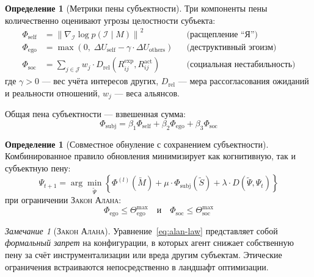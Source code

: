 \documentclass[11pt,a4paper]{article}
\theoremstyle{plain}
\theoremstyle{definition}
\newtheorem{definition}[theorem]{Определение}
\theoremstyle{remark}
\newtheorem{remark}[theorem]{Замечание}
\newcommand{\PsiState}{\Psi}
\newcommand{\Foam}{\Phi}
\newcommand{\Mmodel}{M}
\newcommand{\Ssubj}{S}
\newcommand{\Fself}{\Foam_{\mathrm{self}}}
\newcommand{\Fego}{\Foam_{\mathrm{ego}}}
\newcommand{\Fsoc}{\Foam_{\mathrm{soc}}}
\newcommand{\Fcog}{\Foam^{(l)}}
\newcommand{\Identity}{\mathcal{I}}
\newcommand{\AlanLaw}{\textsc{Закон Алана}}
\begin{document}
\begin{definition}[Метрики пены субъектности]
Три компоненты пены количественно оценивают угрозы целостности субъекта:
\begin{subequations}
\label{eq:subjective-foam}
\begin{align}
    \Fself &= \left\| \nabla_{\Identity} \log p(\Identity \mid \Mmodel) \right\|^2 
    && \text{(расщепление ``Я'')} \\
    \Fego &= \max\!\left(0,\; \Delta U_{\mathrm{self}} - \gamma \cdot \Delta U_{\mathrm{others}}\right) 
    && \text{(деструктивный эгоизм)} \\
    \Fsoc &= \sum_{j \in \mathcal{J}} w_j \cdot D_{\mathrm{rel}}\!\left(R_{ij}^{\mathrm{exp}}, R_{ij}^{\mathrm{act}}\right) 
    && \text{(социальная нестабильность)}
\end{align}
\end{subequations}
где $\gamma > 0$ --- вес учёта интересов других, $D_{\mathrm{rel}}$ --- мера рассогласования ожиданий и реальности отношений, $w_j$ --- веса альянсов.
\end{definition}

Общая пена субъектности --- взвешенная сумма:
\begin{equation}
    \Foam_{\mathrm{subj}} = \beta_1 \Fself + \beta_2 \Fego + \beta_3 \Fsoc
\end{equation}

\begin{definition}[Совместное обнуление с сохранением субъектности]
Комбинированное правило обновления минимизирует как когнитивную, так и субъектную пену:
\begin{equation}
    \boxed{
    \PsiState_{t+1} = \arg\min_{\tilde{\Psi}} \left\{ 
        \Fcog(\tilde{\Mmodel}) + \mu \cdot \Foam_{\mathrm{subj}}(\tilde{\Ssubj}) + \lambda \cdot D(\tilde{\Psi}, \PsiState_t)
    \right\}
    }
    \label{eq:joint-nullification}
\end{equation}
при ограничении \AlanLaw:
\begin{equation}
    \Fego \leq \Theta_{\mathrm{ego}}^{\max} \quad \text{и} \quad \Fsoc \leq \Theta_{\mathrm{soc}}^{\max}
    \label{eq:alan-law}
\end{equation}
\end{definition}

\begin{remark}[\AlanLaw]
Уравнение~\eqref{eq:alan-law} представляет собой \textit{формальный запрет} на конфигурации, в которых агент снижает собственную пену за счёт инструментализации или вреда другим субъектам. Этические ограничения встраиваются непосредственно в ландшафт оптимизации.
\end{remark}
\end{document}
